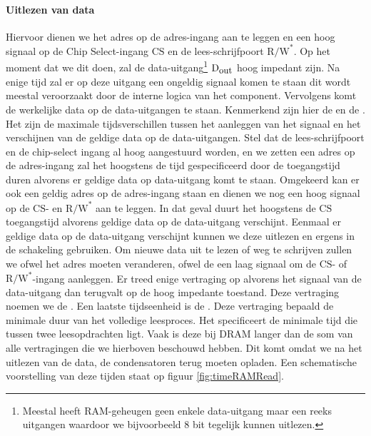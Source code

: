 \paragraph{Uitlezen van data}Hiervoor dienen we het adres op de adres-ingang aan te leggen en een hoog signaal op de Chip Select-ingang $\mbox{CS}$ en de lees-schrijfpoort $\mbox{R/W}^*$. Op het moment dat we dit doen, zal de data-uitgang\footnote{Meestal heeft RAM-geheugen geen enkele data-uitgang maar een reeks uitgangen waardoor we bijvoorbeeld 8 bit tegelijk kunnen uitlezen.} $\mbox{D}_{\mbox{\small{out}}}$ hoog impedant zijn. Na enige tijd zal er op deze uitgang een ongeldig signaal komen te staan dit wordt meestal veroorzaakt door de interne logica van het component. Vervolgens komt de werkelijke data op de data-uitgangen te staan. Kenmerkend zijn hier de  en de . Het zijn de maximale tijdsverschillen tussen het aanleggen van het signaal en het verschijnen van de geldige data op de data-uitgangen. Stel dat de lees-schrijfpoort en de chip-select ingang al hoog aangestuurd worden, en we zetten een adres
op de adres-ingang zal het hoogstens de tijd gespecificeerd door de toegangstijd duren alvorens er geldige data op data-uitgang komt te staan. Omgekeerd kan er ook een geldig adres op de adres-ingang staan en dienen we nog een hoog signaal op de $\mbox{CS}$- en $\mbox{R/W}^*$ aan te leggen. In dat geval duurt het hoogstens de $\mbox{CS}$ toegangstijd alvorens geldige data op de data-uitgang verschijnt. Eenmaal er geldige data op de data-uitgang verschijnt kunnen we deze uitlezen en ergens in de schakeling gebruiken. Om nieuwe data uit te lezen of weg te schrijven zullen we ofwel het adres moeten veranderen, ofwel de een laag signaal om de $\mbox{CS}$- of $\mbox{R/W}^*$-ingang aanleggen. Er treed enige vertraging op alvorens het signaal van de data-uitgang dan terugvalt op de hoog impedante toestand. Deze vertraging noemen we de . Een laatste tijdseenheid is de . Deze vertraging bepaald
de minimale duur van het volledige leesproces. Het specificeert de minimale tijd die tussen twee leesopdrachten ligt. Vaak is deze bij DRAM langer dan de som van alle vertragingen die we hierboven beschouwd hebben. Dit komt omdat we na het uitlezen van de data, de condensatoren terug moeten opladen. Een schematische voorstelling van deze tijden staat op figuur \ref{fig:timeRAMRead}.

